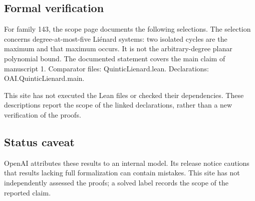 \documentclass[11pt]{article}
\begin{document}
\subsection{Formal verification}
For family 143, the scope page documents the following selections. The selection concerns degree-at-most-five Liénard systems: two isolated cycles are the maximum and that maximum occurs. It is not the arbitrary-degree planar polynomial bound. The documented statement covers the main claim of manuscript 1. Comparator files: QuinticLienard.lean. Declarations: OAI.QuinticLienard.main.

This site has not executed the Lean files or checked their dependencies. These descriptions report the scope of the linked declarations, rather than a new verification of the proofs.

\subsection{Status caveat}
OpenAI attributes these results to an internal model. Its release notice cautions that results lacking full formalization can contain mistakes. This site has not independently assessed the proofs; a solved label records the scope of the reported claim.
\end{document}
